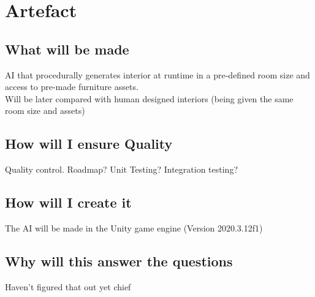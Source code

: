 \section{Artefact}

\subsection{What will be made}

AI that procedurally generates interior at runtime in a pre-defined room size and access to pre-made furniture assets.
\\
Will be later compared with human designed interiors (being given the same room size and assets)

\subsection{How will I ensure Quality}

Quality control. Roadmap? Unit Testing? Integration testing?

\subsection{How will I create it}

The AI will be made in the Unity game engine (Version 2020.3.12f1)

\subsection{Why will this answer the questions}

Haven't figured that out yet chief